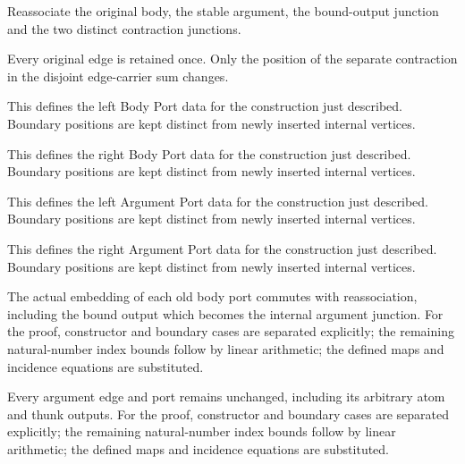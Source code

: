 Reassociate the original body, the stable argument, the bound-output junction and the two distinct contraction junctions.
\par{}

Every original edge is retained once. Only the position of the separate contraction in the disjoint edge-carrier sum changes.
\par{}

This defines the left Body Port data for the construction just described. Boundary positions are kept distinct from newly inserted internal vertices.
\par{}

This defines the right Body Port data for the construction just described. Boundary positions are kept distinct from newly inserted internal vertices.
\par{}

This defines the left Argument Port data for the construction just described. Boundary positions are kept distinct from newly inserted internal vertices.
\par{}

This defines the right Argument Port data for the construction just described. Boundary positions are kept distinct from newly inserted internal vertices.
\par{}

The actual embedding of each old body port commutes with reassociation, including the bound output which becomes the internal argument junction.
For the proof, constructor and boundary cases are separated explicitly; the remaining natural-number index bounds follow by linear arithmetic; the defined maps and incidence equations are substituted.
\par{}

Every argument edge and port remains unchanged, including its arbitrary atom and thunk outputs.
For the proof, constructor and boundary cases are separated explicitly; the remaining natural-number index bounds follow by linear arithmetic; the defined maps and incidence equations are substituted.
\par{}

